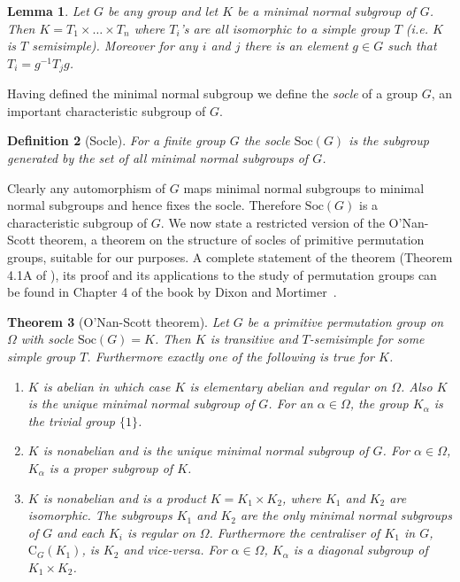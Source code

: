 \documentclass[11pt]{madras}%
\newtheorem{theorem}{Theorem}[chapter]
\newtheorem{lemma}[theorem]{Lemma}
\newtheorem{definition}[theorem]{Definition}
\theoremstyle{remark}
\newcommand{\Soc}[1]{{\ensuremath{\mathrm{Soc}\left(#1\right)}}}
\newcommand{\Cent}[2][]{\ensuremath{\mathrm{C}_{#1}({#2})}}
\newcommand{\nomclgroups}[3][]{{\nomenclature[g#1]{#2}{#3}}}
\begin{document}
\begin{lemma}\label{lem-min-normal}
  Let $G$ be any group and let $K$ be a minimal normal subgroup of
  $G$. Then $K = T_1 \times \ldots \times T_n$ where $T_i$'s are all
  isomorphic to a simple group $T$ (i.e. $K$ is $T$ semisimple).
  Moreover for any $i$ and $j$ there is an element $g \in G$ such that
  $T_i = g^{-1} T_j g$.
\end{lemma}

Having defined the minimal normal subgroup we define the \emph{socle}
of a group $G$, an important characteristic subgroup of $G$.

\begin{definition}[Socle]
  \index{socle}\nomclgroups{$\Soc{G}$}{Socle of $G$\refpage} For a
  finite group $G$ the \emph{socle} $\Soc{G}$ is the subgroup
  generated by the set of all minimal normal subgroups of $G$.
\end{definition}

Clearly any automorphism of $G$ maps minimal normal subgroups to
minimal normal subgroups and hence fixes the socle. Therefore
$\Soc{G}$ is a characteristic subgroup of $G$.  We now state a
restricted version of the O'Nan-Scott theorem, a theorem on the
structure of socles of primitive permutation groups, suitable for our
purposes. A complete statement of the theorem (Theorem 4.1A of
\cite{dixon91permutationbook}), its proof and its applications to the
study of permutation groups can be found in Chapter 4 of the book by
Dixon and Mortimer~\cite{dixon91permutationbook}.


\begin{theorem}[O'Nan-Scott theorem]\label{thm-onan-scott}
  Let $G$ be a primitive permutation group on $\Omega$ with socle
  $\Soc{G} = K$.  Then $K$ is transitive and $T$-semisimple for some
  simple group $T$. Furthermore exactly one of the following is true
  for $K$.
  \begin{enumerate}
  \item $K$ is abelian in which case $K$ is elementary abelian and
    regular on $\Omega$. Also $K$ is the unique minimal normal
    subgroup of $G$. For an $\alpha \in \Omega$, the group $K_\alpha$
    is the trivial group $\{ 1 \}$.\label{case-onan-abelian}
  \item $K$ is nonabelian and is the unique minimal normal subgroup of
    $G$. For $\alpha \in \Omega$, $K_\alpha$ is a proper subgroup of
    $K$.\label{case-onan-nonab1}
  \item $K$ is nonabelian and is a product $K = K_1 \times K_2$, where
    $K_1$ and $K_2$ are isomorphic. The subgroups $K_1$ and $K_2$ are
    the only minimal normal subgroups of $G$ and each $K_i$ is regular
    on $\Omega$. Furthermore the centraliser of $K_1$ in $G$,
    $\Cent[G]{K_1}$, is $K_2$ and vice-versa. For $\alpha \in \Omega$,
    $K_\alpha$ is a diagonal subgroup of $K_1 \times K_2$.
    \label{case-onan-nonab2}
  \end{enumerate}
\end{theorem}
\end{document}
